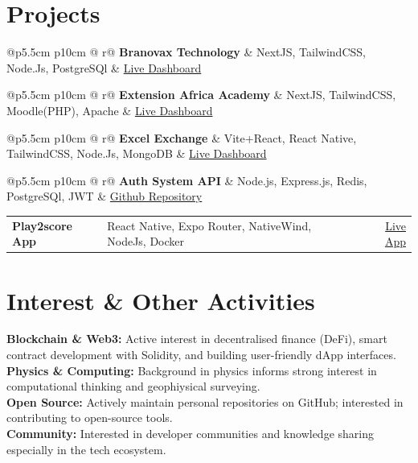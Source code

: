 \documentclass{article}
\makeatletter
\newcommand{\contactinfo}[1]{{\fontsize{12pt}{14pt}\selectfont\color{black!70}#1}}
\newcommand{\project}[3]{%
    \noindent
    \begin{tabular*}{\linewidth}{@{}p{5.5cm} p{10cm} @{\extracolsep{\fill}} r@{}}
        \textbf{#1} & {#2} & {\color{linkcolor}\small #3}
    \end{tabular*}
}
\makeatother
\begin{document}
\section{Projects}
\vspace{-0.3cm}
\noindent
\project{\large{Branovax Technology}}{ NextJS, TailwindCSS, Node.Js, PostgreSQl }{\contactinfo{ \href{https://branovax.com}{Live Dashboard}}} 
\project{\large{Extension Africa Academy}}{ NextJS, TailwindCSS, Moodle(PHP), Apache  }{\contactinfo{ \href{https://academy.extensionafrica.com}{Live Dashboard}}}
\project{\large{Excel Exchange}}{ Vite+React, React Native, TailwindCSS, Node.Js, MongoDB }{\contactinfo{ \href{https://excelexchange.vercel.app}{Live Dashboard}}}
\project{\large{Auth System API}}{ Node.js, Express.js, Redis, PostgreSQl, JWT }{\contactinfo{ \href{https://github.com/Hardeygold205/auth-service-api}{Github Repository}}}
\project{\large{Play2score App}}{ React Native, Expo Router, NativeWind, NodeJs, Docker }{\contactinfo{ \href{https://play.google.com/store/apps/details?id=play2score}{Live App}}}
\vspace{-0.5cm}

\section{Interest \& Other Activities}
\vspace{-0.3cm}
\noindent
\textbf{Blockchain \& Web3:} Active interest in decentralised finance (DeFi), smart contract development with Solidity, and building user-friendly dApp interfaces. \\[0.4ex]
\textbf{Physics \& Computing:} Background in physics informs strong interest in computational thinking and geophiysical surveying. \\[0.4ex]
\textbf{Open Source:} Actively maintain personal repositories on GitHub; interested in contributing to open-source tools. \\[0.4ex]
\textbf{Community:} Interested in developer communities and knowledge sharing especially in the tech ecosystem.
\end{document}
